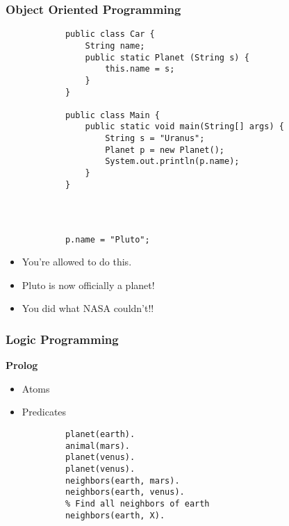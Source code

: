 \documentclass[handout]{beamer}
\begin{document}
    \begin{frame}[fragile]
        \frametitle{Object Oriented Programming}
        \scriptsize
        \begin{verbatim}
            public class Car {
                String name;
                public static Planet (String s) {
                    this.name = s;
                }
            }

            public class Main {
                public static void main(String[] args) {
                    String s = "Uranus";
                    Planet p = new Planet();
                    System.out.println(p.name);
                }
            }
        \end{verbatim}
    \end{frame}

    \begin{frame}[fragile]
        \frametitle{\ \ }

        \begin{verbatim}
            p.name = "Pluto";
        \end{verbatim}

        \begin{itemize}
            \item<2-> You're allowed to do this.
            \item<3-> Pluto is now officially a planet!
            \item<4-> You did what NASA couldn't!!
        \end{itemize}
    \end{frame}

    \begin{frame}[fragile]
        \frametitle{Logic Programming}

        \textbf{Prolog}

        \begin{itemize}
            \item Atoms
            \item Predicates
        \end{itemize}

        \begin{verbatim}
            planet(earth).
            animal(mars).
            planet(venus).
            planet(venus).
            neighbors(earth, mars).
            neighbors(earth, venus).
            % Find all neighbors of earth
            neighbors(earth, X).
        \end{verbatim}

    \end{frame}
\end{document}
